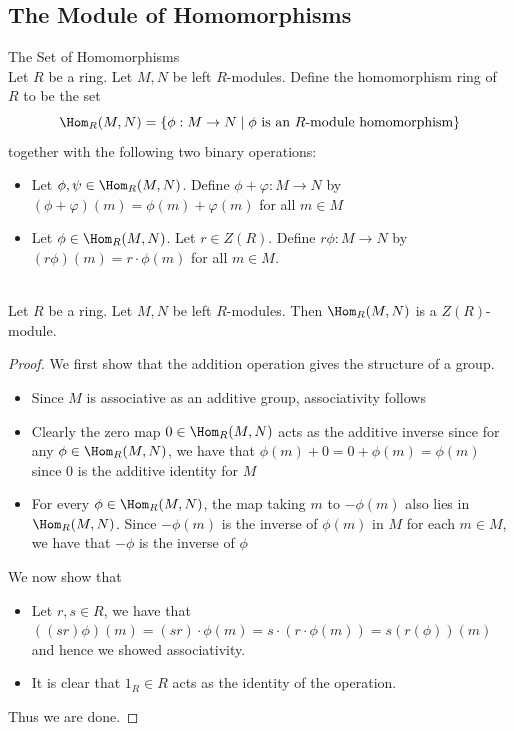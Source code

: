 \documentclass[a4paper]{article}
\begin{document}
\subsection{The Module of Homomorphisms}
\begin{defn}{The Set of Homomorphisms}{}\\
Let $R$ be a ring. Let $M,N$ be left $R$-modules. Define the homomorphism ring of $R$ to be the set $$\Hom_R(M,N)=\{\phi:M\to N\;|\;\phi\text{ is an }R\text{-module homomorphism}\}$$ together with the following two binary operations: 
\begin{itemize}
\item Let $\phi,\psi\in\Hom_R(M,N)$. Define $\phi+\varphi:M\to N$ by $(\phi+\varphi)(m)=\phi(m)+\varphi(m)$ for all $m\in M$
\item Let $\phi\in\Hom_R(M,N)$. Let $r\in Z(R)$. Define $r\phi:M\to N$ by $(r\phi)(m)=r\cdot\phi(m)$ for all $m\in M$. 
\end{itemize} 
\end{defn}

\begin{prp}{}{}\\
Let $R$ be a ring. Let $M,N$ be left $R$-modules. Then $\Hom_R(M,N)$ is a $Z(R)$-module. 
\begin{proof}
We first show that the addition operation gives the structure of a group. 
\begin{itemize}
\item Since $M$ is associative as an additive group, associativity follows
\item Clearly the zero map $0\in\Hom_R(M,N)$ acts as the additive inverse since for any $\phi\in\Hom_R(M,N)$, we have that $\phi(m)+0=0+\phi(m)=\phi(m)$ since $0$ is the additive identity for $M$
\item For every $\phi\in\Hom_R(M,N)$, the map taking $m$ to $-\phi(m)$ also lies in $\Hom_R(M,N)$. Since $-\phi(m)$ is the inverse of $\phi(m)$ in $M$ for each $m\in M$, we have that $-\phi$ is the inverse of $\phi$
\end{itemize}
We now show that 
\begin{itemize}
\item Let $r,s\in R$, we have that $((sr)\phi)(m)=(sr)\cdot\phi(m)=s\cdot(r\cdot\phi(m))=s(r(\phi))(m)$ and hence we showed associativity. 
\item It is clear that $1_R\in R$ acts as the identity of the operation. 
\end{itemize}
Thus we are done. 
\end{proof}
\end{prp}
\end{document}
